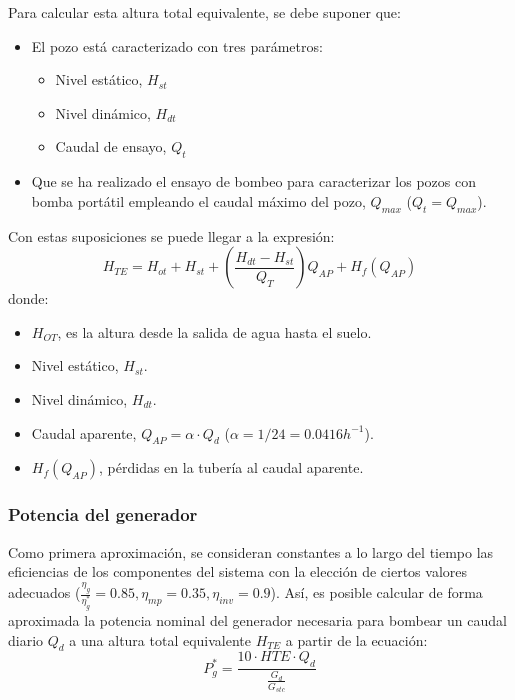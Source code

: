 Para calcular esta altura total equivalente, se debe suponer que:
\begin{itemize}
\item El pozo está caracterizado con tres parámetros:
\begin{itemize}
\item Nivel estático, \(H_{st}\)
\item Nivel dinámico, \(H_{dt}\)
\item Caudal de ensayo, \(Q_t\) 
\end{itemize}
\item Que se ha realizado el ensayo de bombeo para caracterizar los pozos con bomba portátil empleando el caudal máximo del pozo, \(Q_{max}\) (\(Q_t=Q_{max}\)).
\end{itemize}

Con estas suposiciones se puede llegar a la expresión:
\begin{equation}
H_{TE} = H_{ot} + H_{st} + \left( \frac{H_{dt} - H_{st}}{Q_T} \right) Q_{AP} + H_f(Q_{AP})
\end{equation}
donde:
\begin{itemize}
\item \(H_{OT}\), es la altura desde la salida de agua hasta el suelo.
\item Nivel estático, \(H_{st}\).
\item Nivel dinámico, \(H_{dt}\).
\item Caudal aparente, \(Q_{AP} = \alpha \cdot Q_d\)
(\(\alpha=1/24=0.0416h^{-1}\)).
\item \(H_f(Q_{AP})\), pérdidas en la tubería al caudal aparente.
\end{itemize}

\subsubsection{Potencia del generador}
\label{sec:org467a592}
Como primera aproximación, se consideran constantes a lo largo del tiempo las eficiencias de los componentes del sistema con la elección de ciertos valores adecuados (\(\frac{\eta_g}{\eta_g^*}=0.85, \eta_{mp}=0.35, \eta_{inv}=0.9\)). Así, es posible calcular de forma aproximada la potencia nominal del generador necesaria para bombear un caudal diario \(Q_d\) a una altura total equivalente \(H_{TE}\) a partir de la ecuación:
\begin{equation}
P^*_g = \frac{10 \cdot HTE \cdot Q_d}{\frac{G_d}{G_{stc}}}
\end{equation}

